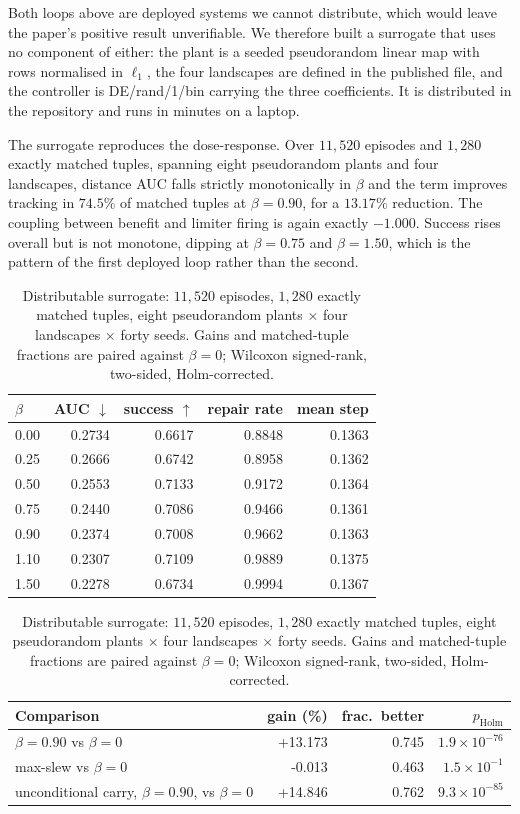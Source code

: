 \documentclass[11pt,a4paper]{article}
\begin{document}
Both loops above are deployed systems we cannot distribute, which would leave the paper's
positive result unverifiable. We therefore built a surrogate that uses no component of
either: the plant is a seeded pseudorandom linear map with rows normalised in $\ell_1$, the
four landscapes are defined in the published file, and the controller is DE/rand/1/bin
carrying the three coefficients. It is distributed in the repository and runs in minutes on
a laptop.

The surrogate reproduces the dose-response. Over $11{,}520$ episodes and $1{,}280$ exactly
matched tuples, spanning eight pseudorandom plants and four landscapes, distance AUC falls
strictly monotonically in $\beta$ and the term improves tracking in $74.5\%$ of matched
tuples at $\beta = 0.90$, for a $13.17\%$ reduction. The coupling between benefit and
limiter firing is again exactly $-1.000$. Success rises overall but is not monotone, dipping
at $\beta = 0.75$ and $\beta = 1.50$, which is the pattern of the first deployed loop rather
than the second.

\begin{table}[htbp]
\centering
\small
\caption{Distributable surrogate: $11{,}520$ episodes, $1{,}280$ exactly matched tuples,
eight pseudorandom plants $\times$ four landscapes $\times$ forty seeds. Gains and
matched-tuple fractions are paired against $\beta = 0$; Wilcoxon signed-rank, two-sided,
Holm-corrected.}
\label{tab:surrogate}
\begin{tabular}{lrrrr}
\toprule
$\beta$ & AUC $\downarrow$ & success $\uparrow$ & repair rate & mean step \\
\midrule
0.00 & 0.2734 & 0.6617 & 0.8848 & 0.1363 \\
0.25 & 0.2666 & 0.6742 & 0.8958 & 0.1362 \\
0.50 & 0.2553 & 0.7133 & 0.9172 & 0.1364 \\
0.75 & 0.2440 & 0.7086 & 0.9466 & 0.1361 \\
0.90 & 0.2374 & 0.7008 & 0.9662 & 0.1363 \\
1.10 & 0.2307 & 0.7109 & 0.9889 & 0.1375 \\
1.50 & 0.2278 & 0.6734 & 0.9994 & 0.1367 \\
\bottomrule
\end{tabular}

\vspace{0.6em}
\begin{tabular}{lrrr}
\toprule
Comparison & gain (\%) & frac.\ better & $p_{\text{Holm}}$ \\
\midrule
$\beta = 0.90$ vs $\beta = 0$ & +13.173 & 0.745 & $1.9 \times 10^{-76}$ \\
max-slew vs $\beta = 0$ & -0.013 & 0.463 & $1.5 \times 10^{-1}$ \\
unconditional carry, $\beta = 0.90$, vs $\beta = 0$ & +14.846 & 0.762 & $9.3 \times 10^{-85}$ \\
\bottomrule
\end{tabular}
\end{table}
\end{document}
